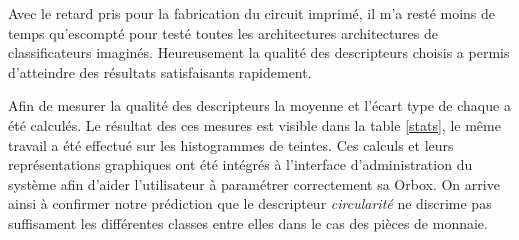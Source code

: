 \documentclass[a4paper]{report}
\begin{document}
Avec le retard pris pour la fabrication du circuit imprimé, il m'a resté moins de temps qu'escompté pour testé toutes les architectures architectures de classificateurs imaginés.
Heureusement la qualité des descripteurs choisis a permis d'atteindre des résultats satisfaisants rapidement.

Afin de mesurer la qualité des descripteurs la moyenne et l'écart type de chaque a été calculés.
Le résultat des ces mesures est visible dans la table \ref{stats}, le même travail a été effectué sur les histogrammes de teintes.
Ces calculs et leurs représentations graphiques ont été intégrés à l'interface d'administration du système afin d'aider l'utilisateur à paramétrer correctement sa Orbox.
On arrive ainsi à confirmer notre prédiction que le descripteur \emph{circularité} ne discrime pas suffisament les différentes classes entre elles dans le cas des pièces de monnaie.

\begin{table}[H]
\centering
{}
\caption{Résultat obtenu pour 921 échantillons parmi 8 classes}
\label{SVM}
\end{table}
\end{document}
